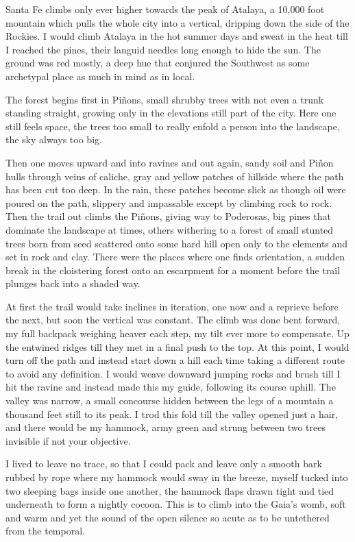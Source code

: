 \documentclass[ebook, 10pt, openright, onecolumn]{memoir}
\begin{document}
Santa Fe climbs only ever higher towards the peak of Atalaya, a 10,000 foot
mountain which pulls the whole city into a vertical, dripping down the side of
the Rockies. I would climb Atalaya in the hot summer days and sweat in the heat
till I reached the pines, their languid needles long enough to hide the sun.
The ground was red mostly, a deep hue that conjured the Southwest as some
archetypal place as much in mind as in local.

The forest begins first in Piñons, small shrubby trees with not even a trunk
standing straight, growing only in the elevations still part of the city.  Here
one still feels space, the trees too small to really enfold a person into the
landscape, the sky always too big. 

Then one moves upward and into ravines and out again, sandy soil and Piñon hulls
through veins of caliche, gray and yellow patches of hillside where the path has
been cut too deep. In the rain, these patches become slick as though oil were
poured on the path, slippery and impassable except by climbing rock to rock.
Then the trail out climbs the Piñons, giving way to Poderosas, big pines that
dominate the landscape at times, others withering to a forest of small stunted
trees born from seed scattered onto some hard hill open only to the elements
and set in rock and clay.  There were the places where one finds orientation, a
sudden break in the cloistering forest onto an escarpment for a moment before the
trail plunges back into a shaded way.

At first the trail would take inclines in iteration, one now and a reprieve
before the next, but soon the vertical was constant.  The climb was done bent
forward, my full backpack weighing heaver each step, my tilt ever more to
compensate.  Up the entwined ridges till they met in a final push to the top.
At this point, I would turn off the path and instead start down a hill each time
taking a different route to avoid any definition. I would weave downward jumping
rocks and brush till I hit the ravine and instead made this my guide, following
its course uphill.  The valley was narrow, a small concourse hidden between the
legs of a mountain a thousand feet still to its peak.  I trod this fold till the
valley opened just a hair, and there would be my hammock, army green and strung
between two trees invisible if not your objective.

I lived to leave no trace, so that I could pack and leave only a smooth bark
rubbed by rope where my hammock would sway in the breeze, myself tucked into two
sleeping bags inside one another, the hammock flaps drawn tight and tied
underneath to form a nightly cocoon.  This is to climb into the Gaia's womb,
soft and warm and yet the sound of the open silence so acute as to be untethered
from the temporal.
\end{document}
